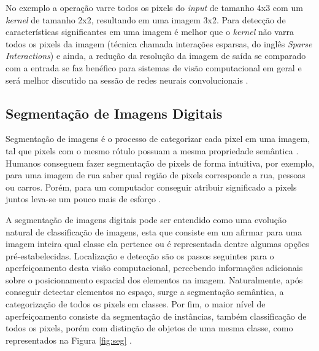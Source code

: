\documentclass[12pt]{report}
\begin{document}
No exemplo a operação varre todos os pixels do \textit{input} de tamanho 4x3 com um \textit{kernel} de tamanho 2x2, resultando em uma imagem 3x2. Para detecção de características significantes em uma imagem é melhor que o \textit{kernel} não varra todos os pixels da imagem (técnica chamada interações esparsas, do inglês \textit{Sparse Interactions}) e ainda, a redução da resolução da imagem de saída se comparado com a entrada se faz benéfico para sistemas de visão computacional em geral e será melhor discutido na sessão de redes neurais convolucionais \cite{Goodfellow}.

\subsection{Segmentação de Imagens Digitais}

Segmentação de imagens é o processo de categorizar cada pixel em uma imagem, tal que pixels com o mesmo rótulo possuam a mesma propriedade semântica \cite{ghosh}. Humanos conseguem fazer segmentação de pixels de forma intuitiva, por exemplo, para uma imagem de rua saber qual região de pixels corresponde a rua, pessoas ou carros. Porém, para um computador conseguir atribuir significado a pixels juntos leva-se um pouco mais de esforço \cite{stanford}.  

A segmentação de imagens digitais pode ser entendido como uma evolução natural de classificação de imagens, esta que consiste em um afirmar para uma imagem inteira qual classe ela pertence ou é representada dentre algumas opções pré-estabelecidas. Localização e detecção são os passos seguintes para o aperfeiçoamento desta visão computacional, percebendo informações adicionais sobre o posicionamento espacial dos elementos na imagem. Naturalmente, após conseguir detectar elementos no espaço, surge a segmentação semântica, a categorização de todos os pixels em classes. Por fim, o maior nível de aperfeiçoamento consiste da segmentação de instâncias, também classificação de todos os pixels, porém com distinção de objetos de uma mesma classe, como representados na Figura \ref{fig:seg} \cite{garcia-garcia}.
\end{document}

